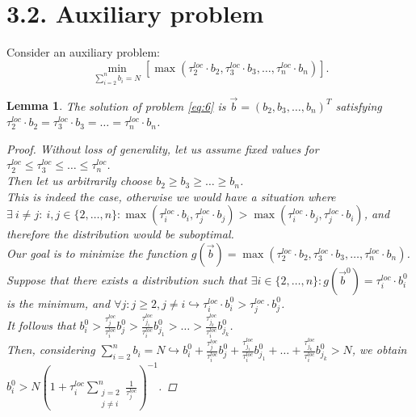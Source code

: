 \documentclass{article}
\theoremstyle{definition}
\theoremstyle{plain}
\newtheorem{lemma}[theorem]{Lemma}
\begin{document}
\section*{3.2. Auxiliary problem}
Consider an auxiliary problem:
\begin{equation}
    \label{eq:6}
    \underset{\sum\limits_{i = 2}^{n} b_i = N}{\min} [\max(\tau_2^{loc}\cdot b_2, \tau_3^{loc}\cdot b_3, \ldots, \tau_n^{loc}\cdot b_n)].
\end{equation}


\begin{lemma}
    \label{l1}
    The solution of problem \eqref{eq:6} is $\overrightarrow{b} = (b_2, b_3, \ldots, b_n)^{T}$ satisfying $\tau_2^{loc}\cdot b_2 = \tau_3^{loc}\cdot b_3 = \ldots = \tau_n^{loc}\cdot b_n$.
    \begin{proof}
        
        Without loss of generality, let us assume fixed values for $\tau_2^{loc}\leq \tau_3^{loc}\leq \ldots \leq \tau_n^{loc}$. \\
        Then let us arbitrarily choose $b_2\geq b_3\geq \ldots \geq b_n$.
        \\
        This is indeed the case, otherwise we would have a situation where $\exists ~ i \neq j: ~ i, j\in \{2, \ldots, n\} : \max(\tau_i^{loc}\cdot b_i, \tau_j^{loc}\cdot b_j) > \max(\tau_i^{loc}\cdot b_j, \tau_j^{loc}\cdot b_i)$, and therefore the distribution would be suboptimal. 
        \\
        Our goal is to minimize the function $g(\overrightarrow{b}) = \max(\tau_2^{loc}\cdot b_2, \tau_3^{loc}\cdot b_3, \ldots, \tau_n^{loc}\cdot b_n)$. 
        \\
        Suppose that there exists a distribution such that $\exists i \in \{2, \ldots, n\}: g(\overrightarrow{b}^0) = \tau_i^{loc}\cdot b_i^0$ is the minimum, and $\forall j: j \geq 2, j \neq i \hookrightarrow \tau_i^{loc}\cdot b_i^0 > \tau_j^{loc}\cdot b_j^0$. 
        \\
        It follows that $b_i^0 > \frac{\tau_j^{loc}}{\tau_i^{loc}}b_j^0 > \frac{\tau_{j_1}^{loc}}{\tau_i^{loc}}b_{j_1}^0 > \ldots > \frac{\tau_{j_k}^{loc}}{\tau_i^{loc}}b_{j_k}^0$. 
        \\
        Then, considering $\sum\limits_{i = 2}^n b_i = N \hookrightarrow b_i^0 + \frac{\tau_j^{loc}}{\tau_i^{loc}}b_j^0 + \frac{\tau_{j_1}^{loc}}{\tau_i^{loc}}b_{j_1}^0 + \ldots + \frac{\tau_{j_k}^{loc}}{\tau_i^{loc}}b_{j_k}^0 > N$,
        we obtain 
        \\
        $b_i^0 > N(1 + \tau_i^{loc}\sum\limits_{\substack{j = 2 \\ j \neq i}}^n \frac{1}{\tau_j^{loc}})^{-1}$.
        

\end{proof}
\end{lemma}
\end{document}
